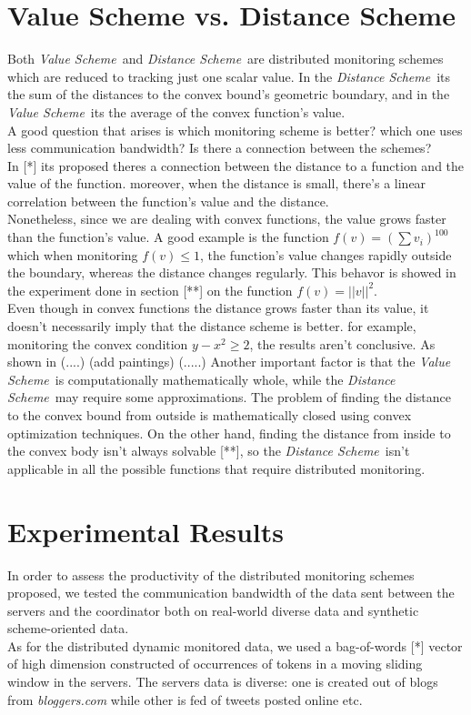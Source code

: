 \documentclass[10pt, conference]{IEEEtran}
\newcommand{\valueScheme}{\textit{Value Scheme}}
\newcommand{\distanceScheme}{\textit{Distance Scheme}}
\begin{document}
\section{Value Scheme vs. Distance Scheme}
Both \valueScheme \ and \distanceScheme \ are distributed monitoring schemes which are reduced to tracking just one scalar value. In the \distanceScheme \ its the sum of the distances to the convex bound's geometric boundary, and in the \valueScheme \ its the average of the convex function's value. \\
A good question that arises is which monitoring scheme is better? which one uses less communication bandwidth? Is there a connection between the schemes? \\
In [*] its proposed theres a connection between the distance to a function and the value of the function. moreover, when the distance is small, there's a linear correlation between the function's value and the distance. \\
Nonetheless, since we are dealing with convex functions, the value grows faster than the function's value. A good example is the function ${f(v) = (\sum v_i)^{100}}$ which  when monitoring ${f(v) \leq 1}$, the function's value changes rapidly outside the boundary, whereas the distance changes regularly.
This behavor is showed in the experiment done in section [**] on the function ${f(v) = ||v||^2}$. \\
Even though in convex functions the distance grows faster than its value, it doesn't necessarily imply that the distance scheme is better. for example, monitoring the convex condition $y-x^2 \geq 2$, the results aren't conclusive. As shown in (....) (add paintings)
(.....)
Another important factor is that the \valueScheme \ is computationally mathematically whole, while the \distanceScheme \ may require some approximations. The problem of finding the distance to the convex bound from outside is mathematically closed using convex optimization techniques. On the other hand, finding the distance from inside to the convex body isn't always solvable [**], so the \distanceScheme \ isn't applicable in all the possible functions that require distributed monitoring.


\section{Experimental Results}
In order to assess the productivity of the distributed monitoring schemes proposed, we tested the communication bandwidth of the data sent between the servers and the coordinator both on real-world diverse data and synthetic scheme-oriented data. \\
As for the distributed dynamic monitored data, we used a bag-of-words [*] vector of high dimension constructed of occurrences of tokens in a moving sliding window in the servers. The servers data is diverse: one is created out of blogs from \textit{bloggers.com} while other is fed of tweets posted online etc. 
\end{document}
